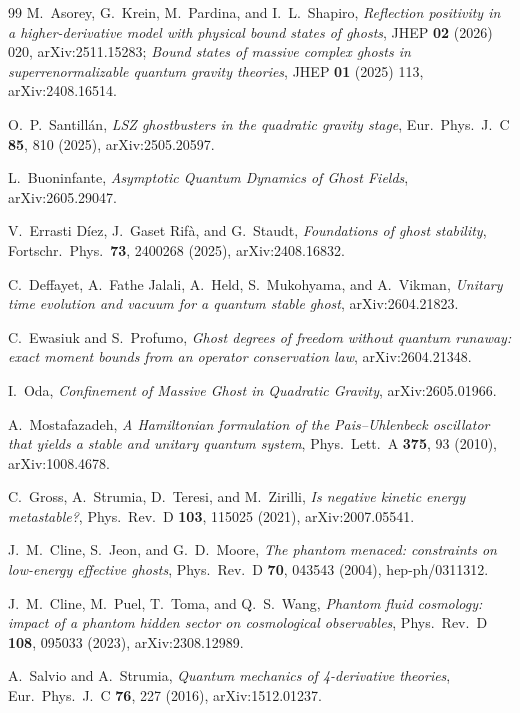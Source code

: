 \documentclass[11pt]{article}
\theoremstyle{definition}
\theoremstyle{remark}
\begin{document}
\begin{thebibliography}{99}
M.~Asorey, G.~Krein, M.~Pardina, and I.~L.~Shapiro,
\emph{Reflection positivity in a higher-derivative model with
physical bound states of ghosts},
JHEP \textbf{02} (2026) 020, arXiv:2511.15283;
\emph{Bound states of massive complex ghosts in superrenormalizable
quantum gravity theories},
JHEP \textbf{01} (2025) 113, arXiv:2408.16514.

O.~P.~Santill\'an,
\emph{LSZ ghostbusters in the quadratic gravity stage},
Eur.\ Phys.\ J.\ C \textbf{85}, 810 (2025), arXiv:2505.20597.

L.~Buoninfante,
\emph{Asymptotic Quantum Dynamics of Ghost Fields},
arXiv:2605.29047.

V.~Errasti D\'iez, J.~Gaset Rif\`a, and G.~Staudt,
\emph{Foundations of ghost stability},
Fortschr.\ Phys.\ \textbf{73}, 2400268 (2025), arXiv:2408.16832.

C.~Deffayet, A.~Fathe Jalali, A.~Held, S.~Mukohyama, and A.~Vikman,
\emph{Unitary time evolution and vacuum for a quantum stable ghost},
arXiv:2604.21823.

C.~Ewasiuk and S.~Profumo,
\emph{Ghost degrees of freedom without quantum runaway: exact moment
bounds from an operator conservation law},
arXiv:2604.21348.

I.~Oda,
\emph{Confinement of Massive Ghost in Quadratic Gravity},
arXiv:2605.01966.

A.~Mostafazadeh,
\emph{A Hamiltonian formulation of the Pais--Uhlenbeck oscillator
that yields a stable and unitary quantum system},
Phys.\ Lett.\ A \textbf{375}, 93 (2010), arXiv:1008.4678.

C.~Gross, A.~Strumia, D.~Teresi, and M.~Zirilli,
\emph{Is negative kinetic energy metastable?},
Phys.\ Rev.\ D \textbf{103}, 115025 (2021), arXiv:2007.05541.

J.~M.~Cline, S.~Jeon, and G.~D.~Moore,
\emph{The phantom menaced: constraints on low-energy effective
ghosts},
Phys.\ Rev.\ D \textbf{70}, 043543 (2004), hep-ph/0311312.

J.~M.~Cline, M.~Puel, T.~Toma, and Q.~S.~Wang,
\emph{Phantom fluid cosmology: impact of a phantom hidden sector on
cosmological observables},
Phys.\ Rev.\ D \textbf{108}, 095033 (2023), arXiv:2308.12989.

A.~Salvio and A.~Strumia,
\emph{Quantum mechanics of 4-derivative theories},
Eur.\ Phys.\ J.\ C \textbf{76}, 227 (2016), arXiv:1512.01237.


\end{thebibliography}
\end{document}

